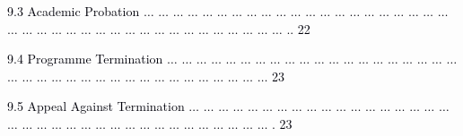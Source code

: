 \documentclass[12pt]{article}
\begin{document}
\vspace{\baselineskip}
\begin{adjustwidth}{0.21in}{0.0in}
{\fontsize{7pt}{8.4pt}\selectfont \textcolor[HTML]{00000A}{9.3 Academic Probation $ \ldots $ $ \ldots $ $ \ldots $ $ \ldots $ $ \ldots $ $ \ldots $ $ \ldots $ $ \ldots $ $ \ldots $ $ \ldots $ $ \ldots $ $ \ldots $ $ \ldots $ $ \ldots $ $ \ldots $ $ \ldots $ $ \ldots $ $ \ldots $ $ \ldots $ $ \ldots $ $ \ldots $ $ \ldots $ $ \ldots $ $ \ldots $ $ \ldots $ $ \ldots $ $ \ldots $ $ \ldots $ $ \ldots $ $ \ldots $ $ \ldots $ $ \ldots $ $ \ldots $ $ \ldots $ $ \ldots $ $ \ldots $ $ \ldots $ $ \ldots $ $ \ldots $ $ \ldots $ .. 22}\par}\par

\end{adjustwidth}


\vspace{\baselineskip}
\begin{adjustwidth}{0.21in}{0.0in}
{\fontsize{7pt}{8.4pt}\selectfont \textcolor[HTML]{00000A}{9.4 Programme Termination $ \ldots $ $ \ldots $ $ \ldots $ $ \ldots $ $ \ldots $ $ \ldots $ $ \ldots $ $ \ldots $ $ \ldots $ $ \ldots $ $ \ldots $ $ \ldots $ $ \ldots $ $ \ldots $ $ \ldots $ $ \ldots $ $ \ldots $ $ \ldots $ $ \ldots $ $ \ldots $ $ \ldots $ $ \ldots $ $ \ldots $ $ \ldots $ $ \ldots $ $ \ldots $ $ \ldots $ $ \ldots $ $ \ldots $ $ \ldots $ $ \ldots $ $ \ldots $ $ \ldots $ $ \ldots $ $ \ldots $ $ \ldots $ $ \ldots $ $ \ldots $  23}\par}\par

\end{adjustwidth}


\vspace{\baselineskip}
\begin{adjustwidth}{0.21in}{0.0in}
{\fontsize{7pt}{8.4pt}\selectfont \textcolor[HTML]{00000A}{9.5 Appeal Against Termination $ \ldots $ $ \ldots $ $ \ldots $ $ \ldots $ $ \ldots $ $ \ldots $ $ \ldots $ $ \ldots $ $ \ldots $ $ \ldots $ $ \ldots $ $ \ldots $ $ \ldots $ $ \ldots $ $ \ldots $ $ \ldots $ $ \ldots $ $ \ldots $ $ \ldots $ $ \ldots $ $ \ldots $ $ \ldots $ $ \ldots $ $ \ldots $ $ \ldots $ $ \ldots $ $ \ldots $ $ \ldots $ $ \ldots $ $ \ldots $ $ \ldots $ $ \ldots $ $ \ldots $ $ \ldots $ $ \ldots $ $ \ldots $ . 23}\par}\par

\end{adjustwidth}
\end{document}
